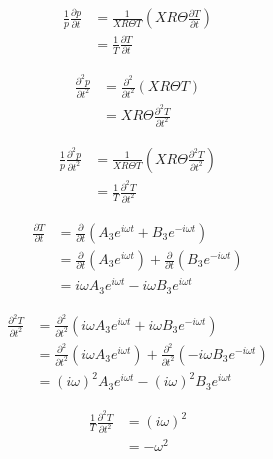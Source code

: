 \begin{align*}
    \frac{1}{p}\frac{\partial p}{\partial t} 
    &=
    \frac{ 1}{X R \Theta T}  \left( XR\Theta\frac{\partial T}{\partial t} \right) \\
    &=\frac{ 1}{ T}\frac{\partial T}{\partial t}  
\end{align*}

\begin{align*}
    \frac{\partial^2 p}{\partial t^2} 
    &=
    \frac{\partial^2 }{\partial t^2}  \left( XR\Theta T \right) \\
    &=
    XR\Theta\frac{\partial^2 T}{\partial t^2}  
\end{align*}


\begin{align*}
    \frac{1}{p}\frac{\partial^2 p}{\partial t^2} 
    &=
    \frac{ 1}{X R \Theta T}  \left( XR\Theta\frac{\partial^2 T}{\partial t^2} \right) \\
    &=\frac{ 1}{ T}\frac{\partial^2 T}{\partial t^2}  
\end{align*}

\begin{align*}
    \frac{\partial T}{\partial t} &=
    \frac{\partial}{\partial t}
        \left( 
        A_3 e^{i \omega t} + B_3 e^{-i \omega t}
    \right)  \\
    &=
    \frac{\partial}{\partial t} \left(A_3 e^{i \omega t}  \right) +
    \frac{\partial}{\partial t} \left(B_3 e^{-i \omega t}  \right)\\ 
    &= i \omega A_3 e^{i \omega t} - i \omega B_3 e^{i \omega t} 
\end{align*}

\begin{align*}
    \frac{\partial^2 T}{\partial t^2} &=
    \frac{\partial^2}{\partial t^2}
        \left( 
        i \omega A_3 e^{i \omega t} + i \omega B_3 e^{-i \omega t}
    \right)  \\
    &=
    \frac{\partial^2}{\partial t^2} \left(i \omega A_3 e^{i \omega t}  \right) +
    \frac{\partial^2}{\partial t^2} \left(- i \omega B_3 e^{-i \omega t}  \right)\\ 
    &= (i \omega)^2 A_3 e^{i \omega t} - (i \omega)^2 B_3 e^{i \omega t} 
\end{align*}

\begin{align*}
    \frac{1}{T}\frac{\partial^2 T}{\partial t^2} 
    &=
    (i\omega)^2 \\
    &= -\omega^2
\end{align*}


